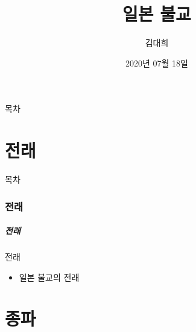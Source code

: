 \documentclass[aspectratio=1610,17pt,xcolor=pdftex,dvipsnames,table,handout]{beamer}
\begin{document}
	

			\title{ 일본 불교 }
			\author{김대희}
			\date{ 2020년 07월 18일 }


%
%
%
%




		\begin{frame}[plain]
		\titlepage
		\end{frame}


		\begin{frame} [plain]{목차}
		\tableofcontents%
		\end{frame}




		\part{ 전래 }
		\frame{\partpage}
		
		\begin{frame} [plain]{목차}
		\tableofcontents%
		\end{frame}
		


		\section{ 전래 }
		\begin{frame} [t,plain]
		\frametitle{ 전래 }
			\begin{block} { 전래  }
			\setlength{\leftmargini}{5em}			
			\begin{itemize}
				\item  일본 불교의 전래
			\end{itemize}
			\end{block}						

		\end{frame}						


		\part{종파}
		\frame{\partpage}
\end{document}
